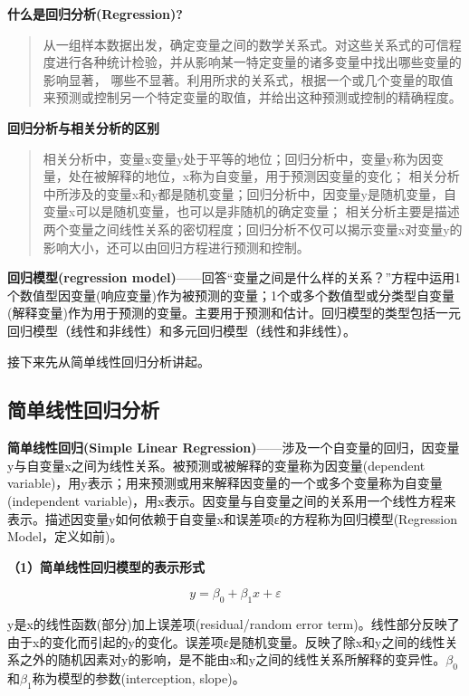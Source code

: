 \documentclass[]{ctexbook}
\begin{document}
\textbf{什么是回归分析(Regression)?}

\begin{quote}
从一组样本数据出发，确定变量之间的数学关系式。对这些关系式的可信程度进行各种统计检验，并从影响某一特定变量的诸多变量中找出哪些变量的影响显著， 哪些不显著。利用所求的关系式，根据一个或几个变量的取值来预测或控制另一个特定变量的取值，并给出这种预测或控制的精确程度。
\end{quote}

\textbf{回归分析与相关分析的区别}

\begin{quote}
相关分析中，变量x变量y处于平等的地位；回归分析中，变量y称为因变量，处在被解释的地位，x称为自变量，用于预测因变量的变化；
相关分析中所涉及的变量x和y都是随机变量；回归分析中，因变量y是随机变量，自变量x可以是随机变量，也可以是非随机的确定变量；
相关分析主要是描述两个变量之间线性关系的密切程度；回归分析不仅可以揭示变量x对变量y的影响大小，还可以由回归方程进行预测和控制。
\end{quote}

\textbf{回归模型(regression model)}------回答``变量之间是什么样的关系？''方程中运用1个数值型因变量(响应变量)作为被预测的变量；1个或多个数值型或分类型自变量 (解释变量)作为用于预测的变量。主要用于预测和估计。回归模型的类型包括一元回归模型（线性和非线性）和多元回归模型（线性和非线性）。

接下来先从简单线性回归分析讲起。

\hypertarget{ux7b80ux5355ux7ebfux6027ux56deux5f52ux5206ux6790}{%
\subsection{简单线性回归分析}\label{ux7b80ux5355ux7ebfux6027ux56deux5f52ux5206ux6790}}

\textbf{简单线性回归(Simple Linear Regression)}------涉及一个自变量的回归，因变量y与自变量x之间为线性关系。被预测或被解释的变量称为因变量(dependent variable)，用y表示；用来预测或用来解释因变量的一个或多个变量称为自变量(independent variable)，用x表示。因变量与自变量之间的关系用一个线性方程来表示。描述因变量y如何依赖于自变量x和误差项ε的方程称为回归模型(Regression Model，定义如前)。

\textbf{（1）简单线性回归模型的表示形式}

\[y=\beta_0+\beta_1 x+\varepsilon\]

y是x的线性函数(部分)加上误差项(residual/random error term)。线性部分反映了由于x的变化而引起的y的变化。误差项ε是随机变量。反映了除x和y之间的线性关系之外的随机因素对y的影响，是不能由x和y之间的线性关系所解释的变异性。\(\beta_0\)和\(\beta_1\)称为模型的参数(interception, slope)。
\end{document}
